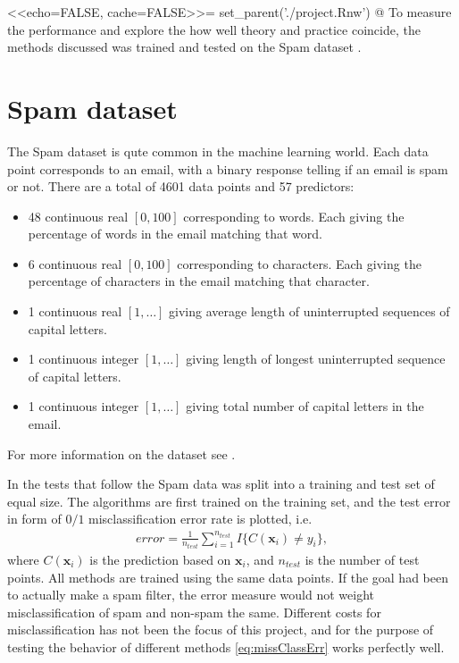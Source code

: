 <<echo=FALSE, cache=FALSE>>=
set_parent('./project.Rnw')
@
%
To measure the performance and explore the how well theory and practice coincide, the methods discussed was trained and tested on the Spam dataset \citep{Spamdata}. 

\section{Spam dataset}
\label{sec:Spam dataset}
 The Spam dataset is qute common in the machine learning world. 
 Each data point corresponds to an email, with a binary response telling if an email is spam or not. There are a total of 4601 data points and 57 predictors:
 \begin{itemize}
   \item 48 continuous real $[0, 100]$ corresponding to words. Each giving the percentage of words in the email matching that word. 
   \item 6 continuous real $[0, 100]$ corresponding to characters. Each giving the percentage of characters in the email matching that character.
   \item 1 continuous real $[1, \ldots]$ giving average length of uninterrupted sequences of capital letters. 
   \item 1 continuous integer $[1, \ldots]$ giving length of longest uninterrupted sequence of capital letters.
   \item 1 continuous integer $[1, \ldots]$ giving total number of capital letters in the email.
 \end{itemize}
 For more information on the dataset see \cite{Spamdata}.

 In the tests that follow the Spam data was split into a training and test set of equal size. The algorithms are first trained on the training set, and the test error in form of $0/1$ misclassification error rate is plotted, i.e.
 \begin{align}
   \label{eq:missClassErr} 
   error =  \frac{1}{n_{test}} \sum_{i = 1}^{n_{test}} I\{C(\mathbf{x}_i) \neq y_i\},
 \end{align}
 where $C(\mathbf{x}_i)$ is the prediction based on $\mathbf{x}_i$, and $n_{test}$ is the number of test points. 
All methods are trained using the same data points. 
If the goal had been to actually make a spam filter, the error measure would not weight misclassification of spam and non-spam the same. Different costs for misclassification has not been the focus of this project, and for the purpose of testing the behavior of different methods \eqref{eq:missClassErr} works perfectly well.



